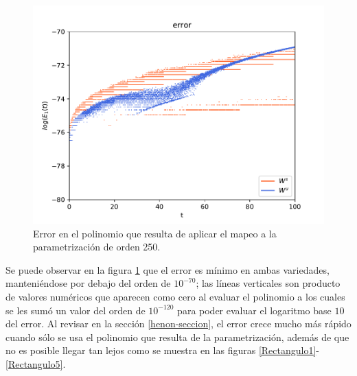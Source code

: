 \begin{figure}[h]
\centering
\includegraphics[scale=0.7]{error1ite.pdf}
\caption{Error en el polinomio que resulta de aplicar el mapeo a la parametrización de orden 250.}
\label{error-1iteracion}
\end{figure}
Se puede observar en la figura \ref{error-1iteracion} que el error es mínimo en ambas variedades, manteniéndose por debajo del orden de $10^{-70}$; las líneas verticales son producto de valores numéricos que aparecen como cero al evaluar el polinomio a los cuales se les sumó un valor del orden de $10^{-120}$ para poder evaluar el logaritmo base $10$ del error. Al revisar en la sección \ref{henon-seccion}, el error crece mucho más rápido cuando sólo se usa el polinomio que resulta de la parametrización, además de que no es posible llegar tan lejos como se muestra en las figuras \ref{Rectangulo1}-\ref{Rectangulo5}.

